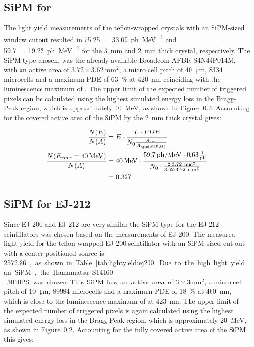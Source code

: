 \subsection{SiPM for }
The light yield measurements of the teflon-wrapped  crystals with an \gls{SiPM}-sized window cutout resulted in \SI{75.25\pm 33.09}{ph\per\mega\electronvolt} and \SI{59.7\pm 19.22}{ph\per\mega\electronvolt} for the \SI{3}{\milli\meter} and \SI{2}{\milli\meter} thick crystal, respectively.
The \gls{SiPM}-type chosen, was the already available Broadcom AFBR-S4N44P014M, with an active area of $3.72 \times 3.62~\si{\milli\meter\squared}$, a micro cell pitch of \SI{40}{\micro\meter}, $8334$ microcells and a maximum \gls{PDE} of \SI{63}{\percent} at \SI{420}{\nano\meter} coinciding with the luminescence maximum of .
The upper limit of the expected number of triggered pixels can be calculated using the highest simulated energy loss in the Bragg-Peak region, which is approximately \SI{40}{\mega\electronvolt}, as shown in Figure~\ref{}.
Accounting for the covered active area of the \gls{SiPM} by the \SI{2}{\milli\meter} thick crystal gives:

\begin{align}
    \frac{N(E)}{N(A)} &= E  \cdot \frac{L \cdot PDE}{N_0 \frac{A_{cov}}{A_{\gls{SiPM}}}}\\
    \frac{N(E_{max}=\SI{40}{\mega\electronvolt})}{N(A)} &=  \SI{40}{\mega\electronvolt} \cdot \frac{\SI{59.7}{ph\per\mega\electronvolt} \cdot 0.63 \frac{\text{1}}{\text{ph}}}{N_0 \cdot \frac{2\cdot3.72~\si{\milli\meter\squared}}{3.62\cdot3.72~\si{\milli\meter\squared}}} \\
    &= 0.327
\end{align}

\subsection{SiPM for EJ-212}
Since EJ-200 and EJ-212 are very similar the \gls{SiPM}-type for the EJ-212 scintillators was chosen based on the measurements of EJ-200.
The measured light yield for the teflon-wrapped EJ-200 scintillator with an \gls{SiPM}-sized cut-out with a center positioned source is \SI{2572.86}, as shown in Table~\ref{tab:lightyield:ej200}.
Due to the high light yield an \gls{SiPM}, the Hamamatsu S14160-3010PS was chosen.
This \gls{SiPM} has an active area of $3\times 3 \si{\mm\squared}$, a micro cell pitch of \SI{10}{\micro\meter}, $89984$ microcells and a maximum \gls{PDE} of \SI{18}{\percent} at \SI{460}{\nano\meter}, which is close to the luminescence maximum of  at \SI{423}{\nano\meter}.
The upper limit of the expected number of triggered pixels is again calculated using the highest simulated energy loss in the Bragg-Peak region, which is approximately \SI{20}{\mega\electronvolt}, as shown in Figure~\ref{}.
Accounting for the fully covered active area of the \gls{SiPM} this gives:

